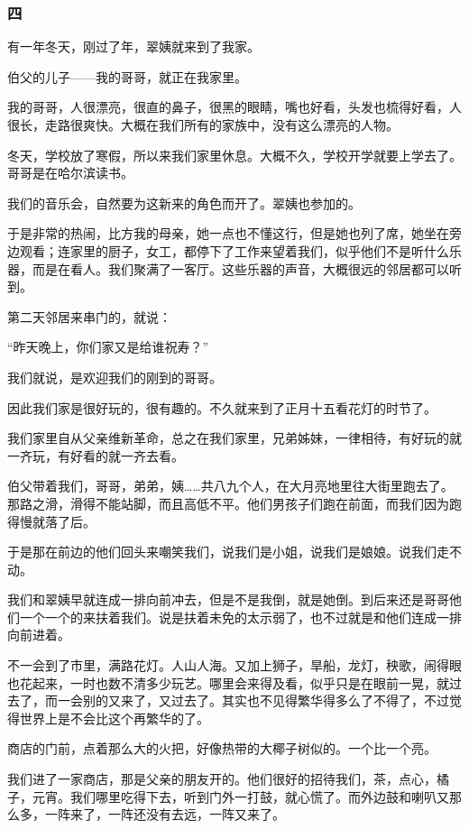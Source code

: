\subsubsection*{四}
\par 有一年冬天，刚过了年，翠姨就来到了我家。
\par 伯父的儿子——我的哥哥，就正在我家里。
\par 我的哥哥，人很漂亮，很直的鼻子，很黑的眼睛，嘴也好看，头发也梳得好看，人很长，走路很爽快。大概在我们所有的家族中，没有这么漂亮的人物。
\par 冬天，学校放了寒假，所以来我们家里休息。大概不久，学校开学就要上学去了。哥哥是在哈尔滨读书。
\par 我们的音乐会，自然要为这新来的角色而开了。翠姨也参加的。
\par 于是非常的热闹，比方我的母亲，她一点也不懂这行，但是她也列了席，她坐在旁边观看；连家里的厨子，女工，都停下了工作来望着我们，似乎他们不是听什么乐器，而是在看人。我们聚满了一客厅。这些乐器的声音，大概很远的邻居都可以听到。
\par 第二天邻居来串门的，就说：
\par “昨天晚上，你们家又是给谁祝寿？”
\par 我们就说，是欢迎我们的刚到的哥哥。
\par 因此我们家是很好玩的，很有趣的。不久就来到了正月十五看花灯的时节了。
\par 我们家里自从父亲维新革命，总之在我们家里，兄弟姊妹，一律相待，有好玩的就一齐玩，有好看的就一齐去看。
\par 伯父带着我们，哥哥，弟弟，姨……共八九个人，在大月亮地里往大街里跑去了。那路之滑，滑得不能站脚，而且高低不平。他们男孩子们跑在前面，而我们因为跑得慢就落了后。
\par 于是那在前边的他们回头来嘲笑我们，说我们是小姐，说我们是娘娘。说我们走不动。
\par 我们和翠姨早就连成一排向前冲去，但是不是我倒，就是她倒。到后来还是哥哥他们一个一个的来扶着我们。说是扶着未免的太示弱了，也不过就是和他们连成一排向前进着。
\par 不一会到了市里，满路花灯。人山人海。又加上狮子，旱船，龙灯，秧歌，闹得眼也花起来，一时也数不清多少玩艺。哪里会来得及看，似乎只是在眼前一晃，就过去了，而一会别的又来了，又过去了。其实也不见得繁华得多么了不得了，不过觉得世界上是不会比这个再繁华的了。
\par 商店的门前，点着那么大的火把，好像热带的大椰子树似的。一个比一个亮。
\par 我们进了一家商店，那是父亲的朋友开的。他们很好的招待我们，茶，点心，橘子，元宵。我们哪里吃得下去，听到门外一打鼓，就心慌了。而外边鼓和喇叭又那么多，一阵来了，一阵还没有去远，一阵又来了。
